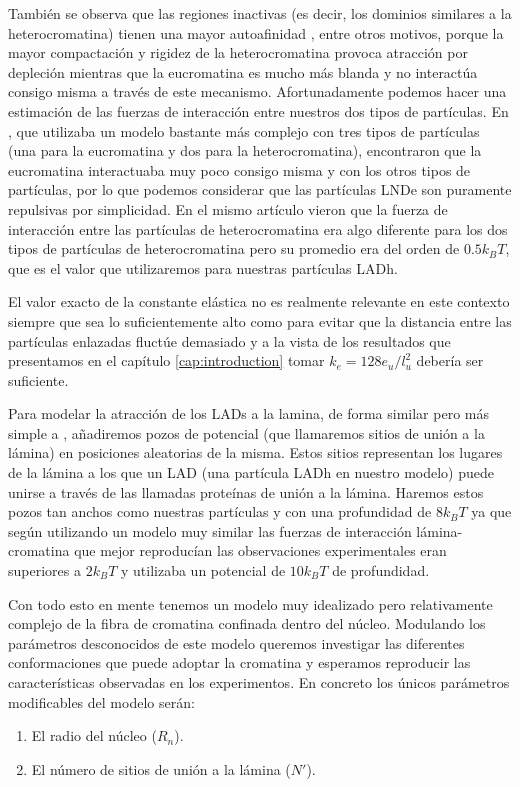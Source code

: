 También se observa que las regiones inactivas (es decir, los dominios similares a la heterocromatina) tienen una mayor autoafinidad \cite{Camara2023}, entre otros motivos, porque la mayor compactación y rigidez de la heterocromatina provoca atracción por depleción mientras que la eucromatina es mucho más blanda y no interactúa consigo misma a través de este mecanismo. Afortunadamente podemos hacer una estimación de las fuerzas de interacción entre nuestros dos tipos de partículas. En \cite{Falk2019}, que utilizaba un modelo bastante más complejo con tres tipos de partículas (una para la eucromatina y dos para la heterocromatina), encontraron que la eucromatina interactuaba muy poco consigo misma y con los otros tipos de partículas, por lo que podemos considerar que las partículas LNDe son puramente repulsivas por simplicidad. En el mismo artículo vieron que la fuerza de interacción entre las partículas de heterocromatina era algo diferente para los dos tipos de partículas de heterocromatina pero su promedio era del orden de $0.5k_BT$, que es el valor que utilizaremos para nuestras partículas LADh.

El valor exacto de la constante elástica no es realmente relevante en este contexto siempre que sea lo suficientemente alto como para evitar que la distancia entre las partículas enlazadas fluctúe demasiado y a la vista de los resultados que presentamos en el capítulo \ref{cap:introduction} tomar $k_e=128e_u/l_u^2$ debería ser suficiente.

Para modelar la atracción de los LADs a la lamina, de forma similar pero más simple a \cite{Bajpai2021}, añadiremos pozos de potencial (que llamaremos sitios de unión a la lámina) en posiciones aleatorias de la misma. Estos sitios representan los lugares de la lámina a los que un LAD (una partícula LADh en nuestro modelo) puede unirse a través de las llamadas proteínas de unión a la lámina. Haremos estos pozos tan anchos como nuestras partículas y con una profundidad de $8k_BT$ ya que según \cite{Maji2020} utilizando un modelo muy similar las fuerzas de interacción lámina-cromatina que mejor reproducían las observaciones experimentales eran superiores a $2k_BT$ y \cite{Bajpai2021} utilizaba un potencial de $10k_BT$ de profundidad.

Con todo esto en mente tenemos un modelo muy idealizado pero relativamente complejo de la fibra de cromatina confinada dentro del núcleo. Modulando los parámetros desconocidos de este modelo queremos investigar las diferentes conformaciones que puede adoptar la cromatina y esperamos reproducir las características observadas en los experimentos. En concreto los únicos parámetros modificables del modelo serán:
\begin{enumerate}
    \item El radio del núcleo ($R_n$).
    \item El número de sitios de unión a la lámina ($N'$).
\end{enumerate}
